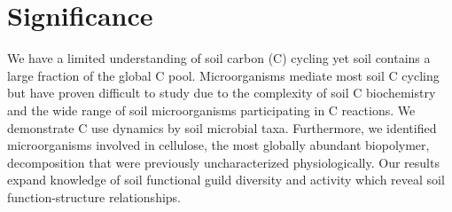 \section{Significance} We have a limited understanding of soil carbon (C)
cycling yet soil contains a large fraction of the global C pool. Microorganisms
mediate most soil C cycling but have proven difficult to study due to the
complexity of soil C biochemistry and the wide range of soil microorganisms
participating in C reactions. We demonstrate C use dynamics by soil microbial
taxa. Furthermore, we identified microorganisms involved in cellulose, the most
globally abundant biopolymer, decomposition that were previously
uncharacterized physiologically. Our results expand knowledge of soil
functional guild diversity and activity which reveal soil function-structure
relationships. 
